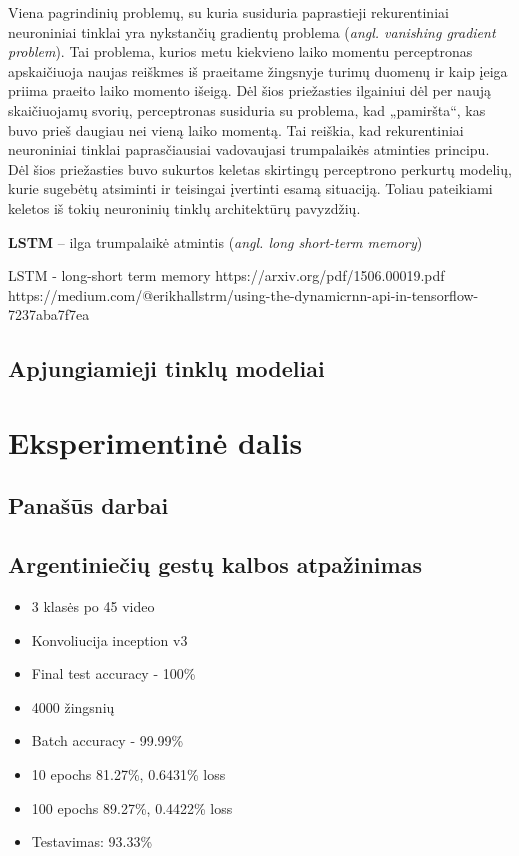 \documentclass{VUMIFPSbakalaurinis}
\begin{document}
Viena pagrindinių problemų, su kuria susiduria paprastieji rekurentiniai neuroniniai tinklai yra nykstančių gradientų problema (\textit{angl. vanishing gradient problem}). Tai problema, kurios metu kiekvieno laiko momentu perceptronas apskaičiuoja naujas reiškmes iš praeitame žingsnyje turimų duomenų ir kaip įeiga priima praeito laiko momento išeigą. Dėl šios priežasties ilgainiui dėl per naują skaičiuojamų svorių, perceptronas susiduria su problema, kad „pamiršta“, kas buvo prieš daugiau nei vieną laiko momentą. Tai reiškia, kad rekurentiniai neuroniniai tinklai paprasčiausiai vadovaujasi trumpalaikės atminties principu. Dėl šios priežasties buvo sukurtos keletas skirtingų perceptrono perkurtų modelių, kurie sugebėtų atsiminti ir teisingai įvertinti esamą situaciją. Toliau pateikiami keletos iš tokių neuroninių tinklų architektūrų pavyzdžių.


\textbf{LSTM} – ilga trumpalaikė atmintis (\textit{angl. long short-term memory})




LSTM - long-short term memory
https://arxiv.org/pdf/1506.00019.pdf
https://medium.com/@erikhallstrm/using-the-dynamicrnn-api-in-tensorflow-7237aba7f7ea

\subsection{Apjungiamieji tinklų modeliai}

\section{Eksperimentinė dalis}

\subsection{Panašūs darbai}

\subsection{Argentiniečių gestų kalbos atpažinimas}

\begin{itemize}
	\item 3 klasės po 45 video
	\item Konvoliucija inception v3 
	\item Final test accuracy - 100\%
	\item 4000 žingsnių
	\item Batch accuracy - 99.99\%
	\item 10 epochs 81.27\%, 0.6431\% loss
	\item 100 epochs 89.27\%, 0.4422\% loss
	\item Testavimas: 93.33\%
\end{itemize}
\end{document}
